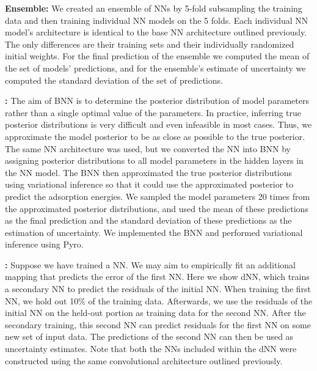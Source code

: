 \documentclass[]{achemso}
\begin{document}
\textbf{ Ensemble:}
We created an ensemble of \gls{NN}s by 5-fold subsampling the training data and then training individual \gls{NN} models on the 5 folds.
Each individual \gls{NN} model's architecture is identical to the base \gls{NN} architecture outlined previously.
The only differences are their training sets and their individually randomized initial weights.
For the final prediction of the ensemble we computed the mean of the set of models' predictions, and for the ensemble's estimate of uncertainty we computed the standard deviation of the set of predictions.

\textbf{:}
The aim of \gls{BNN} is to determine the posterior distribution of model parameters rather than a single optimal value of the parameters.
In practice, inferring true posterior distributions is very difficult and even infeasible in most cases.
Thus, we approximate the model posterior to be as close as possible to the true posterior.
The same \gls{NN} architecture was used, but we converted the \gls{NN} into \gls{BNN} by assigning posterior distributions to all model parameters in the hidden layers in the \gls{NN} model. 
The \gls{BNN} then approximated the true posterior distributions using variational inference so that it could use the approximated posterior to predict the adsorption energies.
We sampled the model parameters 20 times from the approximated posterior distributions, and used the mean of these predictions as the final prediction and the standard deviation of these predictions as the estimation of uncertainty.
We implemented the \gls{BNN} and performed variational inference using Pyro.\cite{Bingham2018}

\textbf{:}
Suppose we have trained a \gls{NN}.
We may aim to empirically fit an additional mapping that predicts the error of the first \gls{NN}.
Here we show \gls{dNN}, which trains a secondary \gls{NN} to predict the residuals of the initial \gls{NN}.
When training the first \gls{NN}, we hold out 10\% of the training data.
Afterwards, we use the residuals of the initial \gls{NN} on the held-out portion as training data for the second \gls{NN}.
After the secondary training, this second \gls{NN} can predict residuals for the first \gls{NN} on some new set of input data.
The predictions of the second \gls{NN} can then be used as uncertainty estimates.
Note that both the \gls{NN}s included within the \gls{dNN} were constructed using the same convolutional architecture outlined previously.
\end{document}
